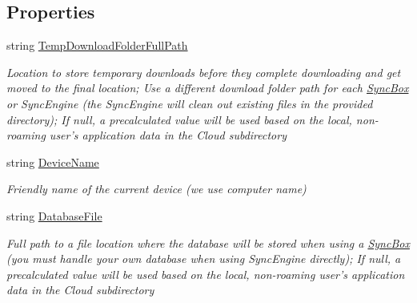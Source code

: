 \subsection*{Properties}
\begin{DoxyCompactItemize}
\item 
string \hyperlink{interface_cloud_api_public_1_1_interfaces_1_1_i_sync_settings_advanced_ad7bd9a4765d6090a05a97222c8cfd222}{Temp\-Download\-Folder\-Full\-Path}
\begin{DoxyCompactList}\small\item\em Location to store temporary downloads before they complete downloading and get moved to the final location; Use a different download folder path for each \hyperlink{class_cloud_api_public_1_1_sync_box}{Sync\-Box} or Sync\-Engine (the Sync\-Engine will clean out existing files in the provided directory); If null, a precalculated value will be used based on the local, non-\/roaming user's application data in the Cloud subdirectory \end{DoxyCompactList}\item 
string \hyperlink{interface_cloud_api_public_1_1_interfaces_1_1_i_sync_settings_advanced_a6c77d27d7e668673e0739f84d500e5f4}{Device\-Name}
\begin{DoxyCompactList}\small\item\em Friendly name of the current device (we use computer name) \end{DoxyCompactList}\item 
string \hyperlink{interface_cloud_api_public_1_1_interfaces_1_1_i_sync_settings_advanced_a16054154b37da7455f410a3b8f074a27}{Database\-File}
\begin{DoxyCompactList}\small\item\em Full path to a file location where the database will be stored when using a \hyperlink{class_cloud_api_public_1_1_sync_box}{Sync\-Box} (you must handle your own database when using Sync\-Engine directly); If null, a precalculated value will be used based on the local, non-\/roaming user's application data in the Cloud subdirectory \end{DoxyCompactList}\end{DoxyCompactItemize}


